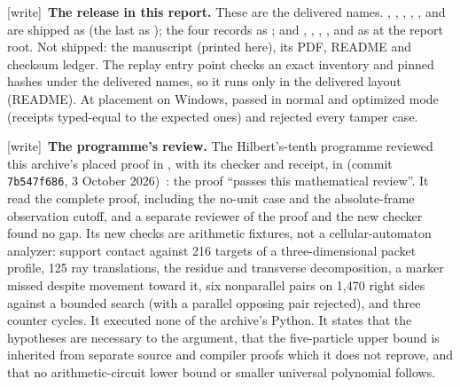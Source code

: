 \documentclass[11pt,letterpaper]{article}
\numberwithin{equation}{section}
\theoremstyle{definition}
\theoremstyle{remark}
\newcommand{\wtag}{\textup{[write]}}
\begin{document}
\wtag\ \textbf{The release in this report.} These are the delivered names. , , , , ,  and  are shipped as  (the last as ); the four  records as ; and , , , ,  and  as  at the report root. Not shipped: the manuscript (printed here), its PDF, README and checksum ledger. The replay entry point checks an exact inventory and pinned hashes under the delivered names, so it runs only in the delivered layout (README). At placement on Windows,  passed in normal and optimized mode (receipts typed-equal to the expected ones) and  rejected every tamper case.

\wtag\ \textbf{The programme's review.} The Hilbert's-tenth programme reviewed this archive's placed proof in , with its checker and receipt, in  (commit \texttt{7b547f686}, 3 October 2026)~\cite{reviewzd}: the proof ``passes this mathematical review''. It read the complete proof, including the no-unit case and the absolute-frame observation cutoff, and a separate reviewer of the proof and the new checker found no gap. Its new checks are arithmetic fixtures, not a cellular-automaton analyzer: support contact against 216 targets of a three-dimensional packet profile, 125 ray translations, the residue and transverse decomposition, a marker missed despite movement toward it, six nonparallel pairs on 1,470 right sides against a bounded search (with a parallel opposing pair rejected), and three counter cycles. It executed none of the archive's Python. It states that the hypotheses are necessary to the argument, that the five-particle upper bound is inherited from separate source and compiler proofs which it does not reprove, and that no arithmetic-circuit lower bound or smaller universal polynomial follows.
\end{document}
